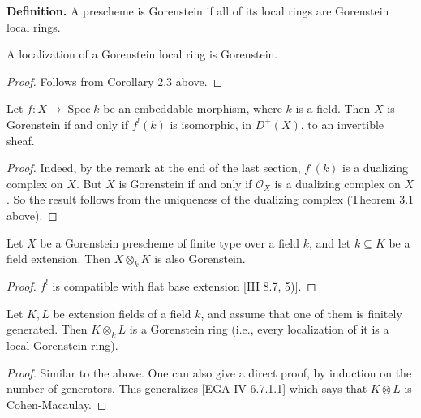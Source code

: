 \documentclass[12pt]{book}
\newcommand{\sheaf}[1]{\mathcal{#1}}
\DeclareMathOperator{\Spec}{Spec}
\begin{document}
\setcounter{page}{296}
\textbf{Definition.}
A prescheme is Gorenstein if all of its local rings are Gorenstein local rings.

\begin{corollary}
A localization of a Gorenstein local ring is Gorenstein.
\end{corollary}
\begin{proof}
Follows from Corollary 2.3 above.
\end{proof}

\begin{proposition}
Let \(f: X \to \Spec k\) be an embeddable morphism, where \(k\) is a field.
Then \(X\) is Gorenstein if and only if \(f^{!}(k)\) is isomorphic, in \(D^{+}(X)\), to an invertible sheaf.
\end{proposition}
\begin{proof}
Indeed, by the remark at the end of the last section, \(f^{!}(k)\) is a dualizing complex on \(X\).
But \(X\) is Gorenstein if and only if \(\sheaf{O}_{X}\) is a dualizing complex on \(X\).
So the result follows from the uniqueness of the dualizing complex (Theorem 3.1 above).
\end{proof}

\begin{corollary}
Let \(X\) be a Gorenstein prescheme of finite type over a field \(k\), and let \(k \subseteq K\) be a field extension.
Then \(X \otimes_{k} K\) is also Gorenstein.
\end{corollary}
\begin{proof}
\(f^{!}\) is compatible with flat base extension [III 8.7, 5)].
\end{proof}

\setcounter{page}{297}
\begin{corollary}
Let \(K, L\) be extension fields of a field \(k\), and assume that one of them is finitely generated.
Then \(K \otimes_{k} L\) is a Gorenstein ring (i.e., every localization of it is a local Gorenstein ring).
\end{corollary}
\begin{proof}
Similar to the above.
One can also give a direct proof, by induction on the number of generators.
This generalizes [EGA IV 6.7.1.1] which says that \(K \otimes L\) is Cohen-Macaulay.
\end{proof}
\end{document}
